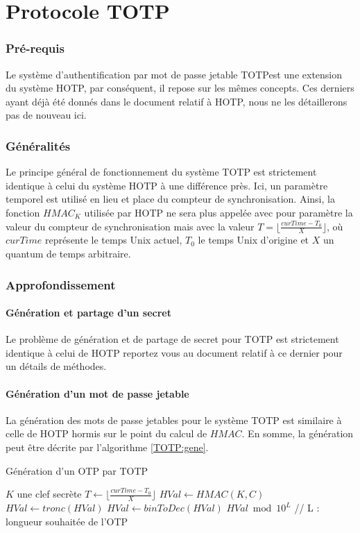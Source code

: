 \documentclass{../res/univ-projet}
\begin{document}
\part{Protocole TOTP}

\setcounter{section}{0}
\section{Pré-requis}
Le système d'authentification par mot de passe jetable \og{}TOTP\fg est une extension du système \og{}HOTP\fg{}, par conséquent, il repose sur les mêmes concepts. Ces 
derniers ayant déjà été donnés dans le document relatif à \og{}HOTP\fg{}, nous ne les détaillerons pas de nouveau ici.

\section{Généralités}
Le principe général de fonctionnement du système \og{}TOTP\fg{} est strictement identique à celui du système \og{}HOTP\fg{} à une différence près. Ici, un paramètre 
temporel est utilisé en lieu et place du compteur de synchronisation. Ainsi, la fonction $HMAC_K$ utilisée par \og{}HOTP\fg{} ne sera plus appelée avec pour paramètre la 
valeur du compteur de synchronisation mais avec la valeur $T = \lfloor{}\frac{curTime - T_0}{X}\rfloor{}$, où $curTime$ représente le temps Unix actuel, $T_0$ le temps Unix \og{}
d'origine\fg{} et $X$ un quantum de temps arbitraire.

\section{Approfondissement}
  \subsection{Génération et partage d'un secret}
    Le problème de génération et de partage de secret pour \og{}TOTP\fg{} est strictement identique à celui de \og{}HOTP\fg{} reportez vous au document relatif à ce 
    dernier pour un détails de méthodes.
    
  \subsection{Génération d'un mot de passe jetable}
    La génération des mots de passe jetables pour le système \og{}TOTP\fg{} est similaire à celle de \og{}HOTP\fg{} hormis sur le point du calcul de $HMAC$. En somme, la 
    génération peut être décrite par l'algorithme \ref{TOTP:gene}.
    \begin{algorithm}
      \caption{Génération d'un OTP par TOTP}
      \label{TOTP:gene}
   
      \begin{algorithmic}
	\REQUIRE $K$ une clef secrète
	\STATE $T \leftarrow \lfloor{}\frac{curTime - T_0}{X}\rfloor{}$
	\STATE $HVal \leftarrow HMAC(K, C)$
	\STATE $HVal \leftarrow tronc(HVal)$
	\STATE $HVal \leftarrow binToDec(HVal)$
	\newline
	\RETURN $HVal \bmod 10^L$ // L : longueur souhaitée de l'OTP
      \end{algorithmic}
    \end{algorithm}
    
\end{document}
